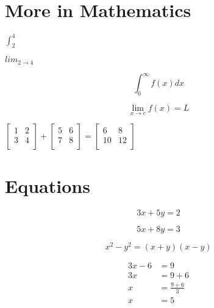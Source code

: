 \documentclass{article}
\begin{document}
    \section{More in Mathematics}

    $\int_{2}^{4}$

    $lim_{2 \to 4}$

    \[ \int_{0}^{\infty} f(x)dx \]

    \[ \lim_{x \to c} f(x)=L \]

    $
    \begin{bmatrix}
        1 & 2 \\
        3 & 4 \\
    \end{bmatrix}
    +
    \begin{bmatrix}
        5 & 6 \\
        7 & 8 \\
    \end{bmatrix}
    =
    \begin{bmatrix}
        6 & 8 \\
        10 & 12 \\
    \end{bmatrix}
    $

    \section{Equations}
    \begin{equation}
        3x + 5y = 2
    \end{equation}
    
    \begin{equation}
        5x + 8y = 3
    \end{equation}

    \begin{equation}
        x^{2} - y^{2} = (x+y)(x-y)
    \end{equation}

    \begin{align}
        3x - 6 &= 9 \\
        3x &= 9 + 6 \nonumber \\
        x &= \frac{9+6}{3} \nonumber \\
        x &= 5 \nonumber
    \end{align}
\end{document}

